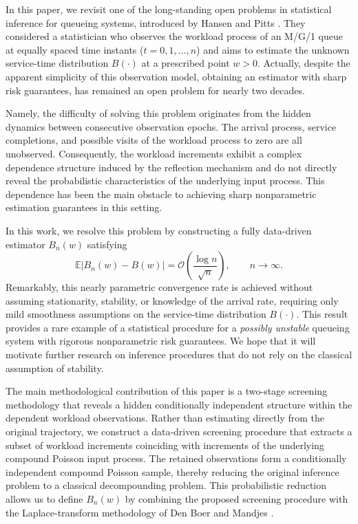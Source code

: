 \documentclass[12pt]{article}
\newcommand{\1}{\mathbf{1}}
\begin{document}
In this paper, we revisit one of the long-standing open problems in statistical inference for queueing systems, introduced by Hansen and Pitts \cite{Hansen2006}. They considered a statistician who observes the workload process of an M/G/1 queue at equally spaced time instants ($t=0,1,\ldots,n$) and aims to estimate the unknown service-time distribution $B(\cdot)$ at a prescribed point $w>0$. Actually, despite the apparent simplicity of this observation model, obtaining an estimator with sharp risk guarantees, has remained an open problem for nearly two decades.

Namely, the difficulty of solving this problem originates from the hidden dynamics between consecutive observation epochs. The arrival process, service completions, and possible visits of the workload process to zero are all unobserved. Consequently, the workload increments exhibit a complex dependence structure induced by the reflection mechanism and do not directly reveal the probabilistic characteristics of the underlying input process. This dependence has been the main obstacle to achieving sharp nonparametric estimation guarantees in this setting.

In this work, we resolve this problem by constructing a fully data-driven estimator $B_n(w)$ satisfying
\[ \mathbb E|B_n(w)-B(w)| = \mathcal O\!\left( \frac{\log n}{\sqrt n} \right), \qquad n\to\infty. \]
Remarkably, this nearly parametric convergence rate is achieved without assuming stationarity, stability, or knowledge of the arrival rate, requiring only mild smoothness assumptions on the service-time distribution $B(\cdot)$. This result provides a rare example of a statistical procedure for a \textit{possibly unstable} queueing system with rigorous nonparametric risk guarantees. We hope that it will motivate further research on inference procedures that do not rely on the classical assumption of stability.


The main methodological contribution of this paper is a two-stage screening methodology that reveals a hidden conditionally independent structure within the dependent workload observations. Rather than estimating directly from the original trajectory, we construct a data-driven screening procedure that extracts a subset of workload increments coinciding with increments of the underlying compound Poisson input process. The retained observations form a conditionally independent compound Poisson sample, thereby reducing the original inference problem to a classical decompounding problem. This probabilistic reduction allows us to define $B_n(w)$ by combining the proposed screening procedure with the Laplace-transform methodology of Den Boer and Mandjes \cite{Den Boer2017}. 
\end{document}
